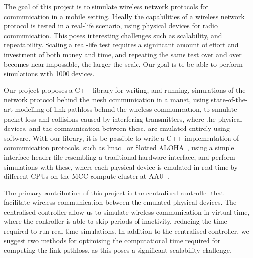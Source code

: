 

The goal of this project is to simulate wireless network protocols for communication in a mobile setting. Ideally the capabilities of a wireless network protocol is tested in a real-life scenario, using physical devices for radio communication. This poses interesting challenges such as scalability, and repeatability. Scaling a real-life test requires a significant amount of effort and investment of both money and time, and repeating the same test over and over becomes near impossible, the larger the scale. Our goal is to be able to perform simulations with 1000 devices.
\smallbreak

Our project proposes a C++ library for writing, and running, simulations of the network protocol behind the mesh communication in a \gls{manet}, using state-of-the-art modelling of link \gls{pathloss} behind the wireless communication, to simulate packet loss and collisions caused by interfering transmitters, where the physical devices, and the communication between these, are emulated entirely using software. With our library, it is be possible to write a C++ implementation of communication protocols, such as \gls{lmac}~\cite{paper:lmac_protocol} or Slotted ALOHA~\cite{Roberts:1975:APS:1024916.1024920}, using a simple interface header file resembling a traditional hardware interface, and perform simulations with these, where each physical device is emulated in real-time by different CPUs on the MCC compute cluster at AAU~\cite{website:mccaau}. \smallbreak

The primary contribution of this project is the centralised controller that facilitate wireless communication between the emulated physical devices. The centralised controller allow us to simulate wireless communication in virtual time, where the controller is able to skip periods of inactivity, reducing the time required to run real-time simulations. In addition to the centralised controller, we suggest two methods for optimising the computational time required for computing the link \gls{pathloss}, as this poses a significant scalability challenge.


